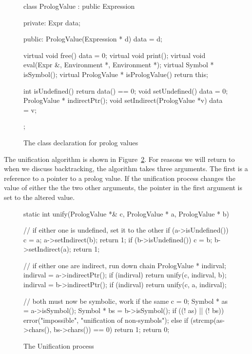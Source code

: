 \begin{figure}
\begin{cprog}
class PrologValue : public Expression {
private:
	Expr data;

public:
	PrologValue(Expression * d) { data = d; }

	virtual void free() { data = 0; }
	virtual void print();
	virtual void eval(Expr &, Environment *, Environment *);
	virtual Symbol * isSymbol();
	virtual PrologValue * isPrologValue() { return this; }

	int isUndefined() 			{ return data() == 0; }
	void setUndefined() 			{ data = 0; }
	PrologValue * indirectPtr();
	void setIndirect(PrologValue *v) 	{ data = v; }
};
\end{cprog}
\caption{The class declaration for prolog values}\label{prologvalue}
\end{figure}

The unification algorithm is shown in Figure~\ref{unify}.  For reasons we
will return to when we discuss backtracking, the algorithm takes three
arguments.  The first is a reference to a pointer to a prolog value.
If the unification process changes the value of either the the two other
arguments, the pointer in the first argument is set to the altered value.

\begin{figure}
\begin{cprog}
static int unify(PrologValue *& c, PrologValue * a, PrologValue * b)
{

	// if either one is undefined, set it to the other
	if (a->isUndefined()) {
		c = a;
		a->setIndirect(b);
		return 1;
		}
	if (b->isUndefined()) {
		c = b;
		b->setIndirect(a);
		return 1;
		}

	// if either one are indirect, run down chain
	PrologValue * indirval;
	indirval = a->indirectPtr();
	if (indirval)
		return unify(c, indirval, b);
	indirval = b->indirectPtr();
	if (indirval)
		return unify(c, a, indirval);

	// both must now be symbolic, work if the same
	c = 0;
	Symbol * as = a->isSymbol();
	Symbol * bs = b->isSymbol();
	if ((! as) || (! bs)) 
		error("impossible", "unification of non-symbols");
	else if (strcmp(as->chars(), bs->chars()) == 0)
		return 1;
	return 0;
}
\end{cprog}
\caption{The Unification process}\label{unify}
\end{figure}

